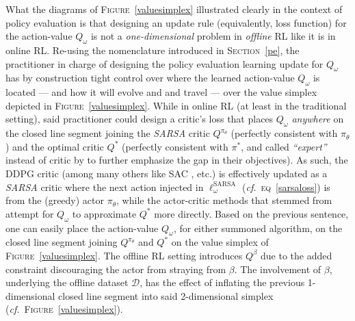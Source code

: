 What the diagrams of \textsc{Figure}~\ref{valuesimplex} illustrated clearly in the context
of policy evaluation is that designing an
update rule (equivalently, loss function) for the action-value $Q_\omega$
is not a \emph{one-dimensional} problem in \emph{offline} RL like it is in online RL.
Re-using the nomenclature introduced in \textsc{Section}~\ref{pe}, the practitioner in charge of designing the
policy evaluation learning update for $Q_\omega$ has by construction tight control over where the learned
action-value $Q_\omega$ is located --- and how it will evolve and and travel --- over the value simplex
depicted in \textsc{Figure}~\ref{valuesimplex}.
While in online RL (at least in the traditional setting), said practitioner could design a critic's loss that
places $Q_\omega$ \emph{anywhere} on the closed line segment joining the
\textit{SARSA} critic $Q^{\pi_\theta}$ (perfectly consistent with $\pi_\theta$)
and the optimal critic $Q^*$ (perfectly consistent with $\pi^*$, and called
\textit{``expert''} instead of critic by \cite{Lim2018-ey}
to further emphasize the gap in their objectives).
As such, the DDPG \cite{Lillicrap2016-xa}
critic (among many others like SAC \cite{Haarnoja2018-bm}, etc.)
is effectively updated as a \textit{SARSA} critic where the next action injected in $\ell^\text{SARSA}_\omega$
(\textit{cf.}~\textsc{eq}~\ref{sarsaloss}) is from the (greedy) actor $\pi_\theta$,
while the actor-critic methods that stemmed from \cite{Crites1995-hn}
attempt for $Q_\omega$ to approximate $Q^*$ more directly.
Based on the previous sentence, one can easily place the action-value $Q_\omega$, for either summoned algorithm,
on the closed line segment joining $Q^{\pi_\theta}$ and $Q^*$ on
the value simplex of \textsc{Figure}~\ref{valuesimplex}.
The offline RL setting introduces $Q^\beta$
due to the added constraint discouraging the actor from straying from $\beta$.
The involvement of $\beta$, underlying the offline dataset $\mathcal{D}$, has the effect of
inflating the previous 1-dimensional closed line segment into said 2-dimensional simplex
(\textit{cf.}~\textsc{Figure}~\ref{valuesimplex}).

